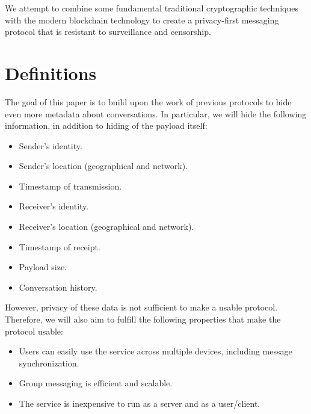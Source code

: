 We attempt to combine some fundamental traditional cryptographic techniques with the modern blockchain technology to create a privacy-first messaging protocol that is resistant to surveillance and censorship.

\section{Definitions}\label{definitions}

The goal of this paper is to build upon the work of previous protocols to hide even more metadata about conversations. In particular, we will hide the following information, in addition to hiding of the payload itself:

\begin{itemize}
\item
  Sender's identity.
\item
  Sender's location (geographical and network).
\item
  Timestamp of transmission.
\item
  Receiver's identity.
\item
  Receiver's location (geographical and network).
\item
  Timestamp of receipt.
\item
  Payload size.
\item
  Conversation history.
\end{itemize}

However, privacy of these data is not sufficient to make a usable protocol. Therefore, we will also aim to fulfill the following properties that make the protocol usable:

\begin{itemize}
\item
  Users can easily use the service across multiple devices, including message synchronization.
\item
  Group messaging is efficient and scalable.
\item
  The service is inexpensive to run as a server and as a user/client.
\end{itemize}

